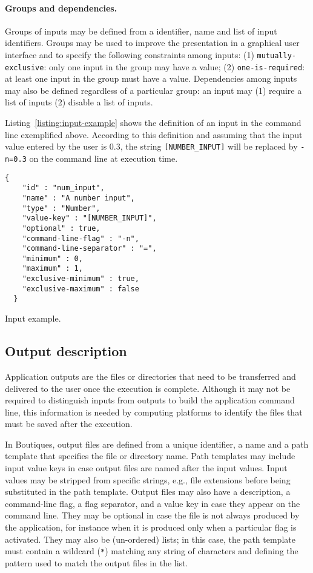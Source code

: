 \documentclass{article}
\begin{document}
\paragraph{Groups and dependencies.} Groups of inputs may be defined
from a identifier, name and list of input identifiers. Groups may be
used to improve the presentation in a graphical user interface and to
specify the following constraints among inputs: (1)
\texttt{mutually-exclusive}: only one input in the group may have a
value; (2) \texttt{one-is-required}: at least one input in the group
must have a value. Dependencies among inputs may also be defined
regardless of a particular group: an input may (1) require a list of
inputs (2) disable a list of inputs.

Listing~\ref{listing:input-example} shows the definition of an input
in the command line exemplified above. According to this definition
and assuming that the input value entered by the user is 0.3, the
string \texttt{[NUMBER\_INPUT]} will be replaced by \texttt{-n=0.3} on
the command line at execution time.
\begin{listing}
\begin{verbatim}
{
    "id" : "num_input",
    "name" : "A number input",
    "type" : "Number",
    "value-key" : "[NUMBER_INPUT]",
    "optional" : true,
    "command-line-flag" : "-n",
    "command-line-separator" : "=",
    "minimum" : 0,
    "maximum" : 1,
    "exclusive-minimum" : true,
    "exclusive-maximum" : false
  }
\end{verbatim}
\caption{Input example.} 
\label{listing:input-example}
\end{listing}

\subsection{Output description}

Application outputs are the files or directories that need to be
transferred and delivered to the user once the execution is
complete. Although it may not be required to distinguish inputs from
outputs to build the application command line, this information is
needed by computing platforms to identify the files that must be
saved after the execution.

In Boutiques, output files are defined from a unique identifier, a
name and a path template that specifies the file or directory
name. Path templates may include input value keys in case
output files are named after the input values. Input values may be
stripped from specific strings, e.g., file extensions before being
substituted in the path template. Output files may also have a
description, a command-line flag, a flag separator, and a value
key in case they appear on the command line. They may be optional in
case the file is not always produced by the application, for instance
when it is produced only when a particular flag is activated. They
may also be (un-ordered) lists; in this case, the path template must
contain a wildcard (\texttt{*}) matching any string of characters
and defining the pattern used to match the
output files in the list.
\end{document}
